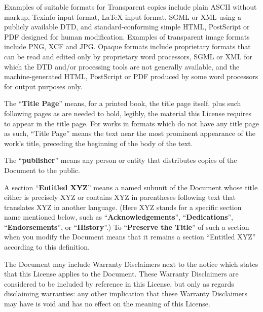 \ifdefined\chs

\fi

\ifdefined\eng
Examples of suitable formats for Transparent copies include plain
ASCII without markup, Texinfo input format, LaTeX input format, SGML
or XML using a publicly available DTD, and standard-conforming simple
HTML, PostScript or PDF designed for human modification.  Examples of
transparent image formats include PNG, XCF and JPG.  Opaque formats
include proprietary formats that can be read and edited only by
proprietary word processors, SGML or XML for which the DTD and/or
processing tools are not generally available, and the
machine-generated HTML, PostScript or PDF produced by some word
processors for output purposes only.
\fi

\ifdefined\chs

\fi

\ifdefined\eng
The ``\textbf{Title Page}'' means, for a printed book, the title page itself,
plus such following pages as are needed to hold, legibly, the material
this License requires to appear in the title page.  For works in
formats which do not have any title page as such, ``Title Page'' means
the text near the most prominent appearance of the work's title,
preceding the beginning of the body of the text.
\fi

\ifdefined\chs

\fi

\ifdefined\eng
The ``\textbf{publisher}'' means any person or entity that distributes
copies of the Document to the public.
\fi

\ifdefined\chs

\fi

\ifdefined\eng
A section ``\textbf{Entitled XYZ}'' means a named subunit of the Document whose
title either is precisely XYZ or contains XYZ in parentheses following
text that translates XYZ in another language.  (Here XYZ stands for a
specific section name mentioned below, such as ``\textbf{Acknowledgements}'',
``\textbf{Dedications}'', ``\textbf{Endorsements}'', or ``\textbf{History}''.)  
To ``\textbf{Preserve the Title}''
of such a section when you modify the Document means that it remains a
section ``Entitled XYZ'' according to this definition.
\fi

\ifdefined\chs

\fi

\ifdefined\eng
The Document may include Warranty Disclaimers next to the notice which
states that this License applies to the Document.  These Warranty
Disclaimers are considered to be included by reference in this
License, but only as regards disclaiming warranties: any other
implication that these Warranty Disclaimers may have is void and has
no effect on the meaning of this License.
\fi

